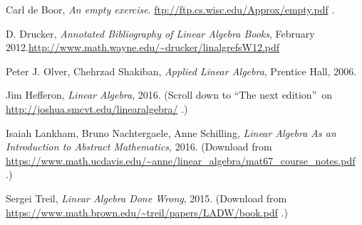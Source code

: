 \documentclass[numbers=enddot,12pt,final,onecolumn,notitlepage]{scrartcl}%
\newcounter{exer}
\theoremstyle{definition}
\begin{document}
\begin{thebibliography}{999999999}                                                                                        %


Carl de Boor, \textit{An empty exercise}.
\url{ftp://ftp.cs.wisc.edu/Approx/empty.pdf} .

D. Drucker, \textit{Annotated Bibliography of
Linear Algebra Books}, February 2012.\newline\url{http://www.math.wayne.edu/~drucker/linalgrefsW12.pdf}

Peter J. Olver, Chehrzad Shakiban, \textit{Applied
Linear Algebra}, Prentice Hall, 2006.

Jim Hefferon, \textit{Linear Algebra}, 2016.
(Scroll down to \textquotedblleft The next edition\textquotedblright\ on
\url{http://joshua.smcvt.edu/linearalgebra/} .)

Isaiah Lankham, Bruno Nachtergaele, Anne
Schilling, \textit{Linear Algebra As an Introduction to Abstract Mathematics},
2016. (Download from
\url{https://www.math.ucdavis.edu/~anne/linear_algebra/mat67_course_notes.pdf} .)

Sergei Treil, \textit{Linear Algebra Done Wrong},
2015. (Download from
\url{https://www.math.brown.edu/~treil/papers/LADW/book.pdf} .)
\end{thebibliography}
\end{document}
